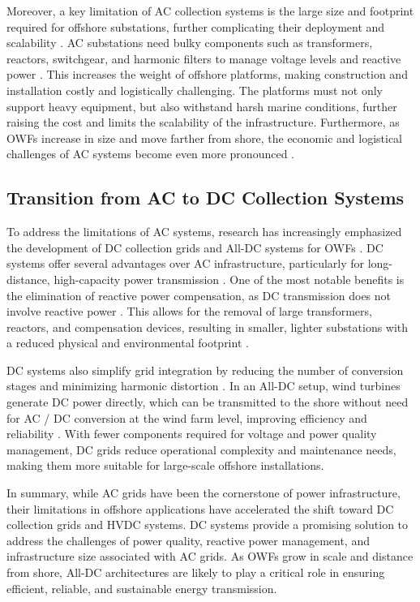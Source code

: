 \documentclass{ieeeaccess}
\begin{document}
Moreover, a key limitation of AC collection systems is the large size and footprint required for offshore substations, further complicating their deployment and scalability \cite{lakshmanan2021electrical}. AC substations need bulky components such as transformers, reactors, switchgear, and harmonic filters to manage voltage levels and reactive power \cite{pillay2021comparative}. This increases the weight of offshore platforms, making construction and installation costly and logistically challenging. The platforms must not only support heavy equipment, but also withstand harsh marine conditions, further raising the cost and limits the scalability of the infrastructure. Furthermore, as OWFs increase in size and move farther from shore, the economic and logistical challenges of AC systems become even more pronounced \cite{yang2022critical}.

\subsection{\textbf{Transition from AC to DC Collection Systems}}

To address the limitations of AC systems, research has increasingly emphasized the development of DC collection grids and All-DC systems for OWFs \cite{timmers2023all}. DC systems offer several advantages over AC infrastructure, particularly for long-distance, high-capacity power transmission \cite{musasa2017review}. One of the most notable benefits is the elimination of reactive power compensation, as DC transmission does not involve reactive power \cite{abeynayake2019review}. This allows for the removal of large transformers, reactors, and compensation devices, resulting in smaller, lighter substations with a reduced physical and environmental footprint \cite{follo2021challenges}.

DC systems also simplify grid integration by reducing the number of conversion stages and minimizing harmonic distortion \cite{karlsson2023managing}. In an All-DC setup, wind turbines generate DC power directly, which can be transmitted to the shore without need for AC / DC conversion at the wind farm level, improving efficiency and reliability \cite{song2022modular}. With fewer components required for voltage and power quality management, DC grids reduce operational complexity and maintenance needs, making them more suitable for large-scale offshore installations.


In summary, while AC grids have been the cornerstone of power infrastructure, their limitations in offshore applications have accelerated the shift toward DC collection grids and HVDC systems. DC systems provide a promising solution to address the challenges of power quality, reactive power management, and infrastructure size associated with AC grids. As OWFs grow in scale and distance from shore, All-DC architectures are likely to play a critical role in ensuring efficient, reliable, and sustainable energy transmission.
\end{document}
